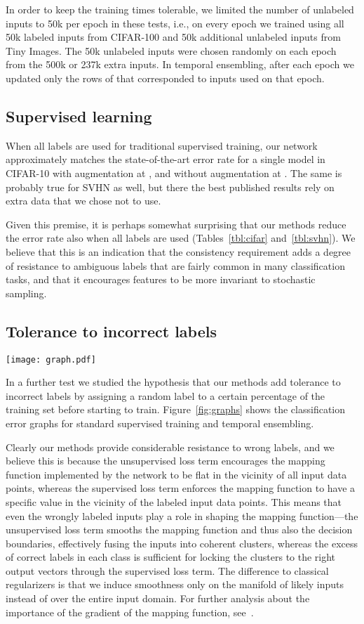 \documentclass{article}
\newcommand{\figgraphs}{
\begin{figure*}[t]
\centering \texttt{[image: graph.pdf]}
\caption{\label{fig:graphs}Percentage of correct SVHN classifications as a function of training epoch when a part of the labels is randomized. With standard supervised training (left) the classification accuracy suffers when even a small portion of the labels give disinformation, and the situation worsens quickly as the portion of randomized labels increases to 50\% or more. On the other hand, temporal ensembling (right) shows almost perfect resistance to disinformation when half of the labels are random, and retains over ninety percent classification accuracy even when 80\% of the labels are random.
}
\end{figure*}
}
\begin{document}
In order to keep the training times tolerable, we limited the number of unlabeled inputs to 50k per epoch in these tests, i.e., on every epoch we trained using all 50k labeled inputs from CIFAR-100 and 50k additional unlabeled inputs from Tiny Images. The 50k unlabeled inputs were chosen randomly on each epoch from the 500k or 237k extra inputs. In temporal ensembling, after each epoch we updated only the rows of  that corresponded to inputs used on that epoch.

\subsection{Supervised learning}

When all labels are used for traditional supervised training, our network approximately matches the state-of-the-art error rate for a single model in CIFAR-10 with augmentation \citep{Lee15,Mishkin15} at , and without augmentation \citep{Salimans16} at . The same is probably true for SVHN as well, but there the best published results rely on extra data that we chose not to use.

Given this premise, it is perhaps somewhat surprising that our methods reduce the error rate also when all labels are used (Tables~\ref{tbl:cifar} and~\ref{tbl:svhn}). We believe that this is an indication that the consistency requirement adds a degree of resistance to ambiguous labels that are fairly common in many classification tasks, and that it encourages features to be more invariant to stochastic sampling.

\subsection{Tolerance to incorrect labels}
\label{sec:random_labels}
\figgraphs

In a further test we studied the hypothesis that our methods add tolerance to incorrect labels by assigning a random label to a certain percentage of the training set before starting to train. Figure~\ref{fig:graphs} shows the classification error graphs for standard supervised training and temporal ensembling. 

Clearly our methods provide considerable resistance to wrong labels, and we believe this is because
the unsupervised loss term encourages the mapping function implemented by the network to be flat in the vicinity of all input data points, whereas the supervised loss term enforces the mapping function to have a specific value in the vicinity of the labeled input data points. This means that even the wrongly labeled inputs play a role in shaping the mapping function---the unsupervised loss term smooths the mapping function and thus also the decision boundaries, effectively fusing the inputs into coherent clusters, whereas the excess of correct labels in each class is sufficient for locking the clusters to the right output vectors through the supervised loss term. The difference to classical regularizers is that we induce smoothness only on the manifold of likely inputs instead of over the entire input domain. For further analysis about the importance of the gradient of the mapping function, see~\cite{Simard1998}.
\end{document}

